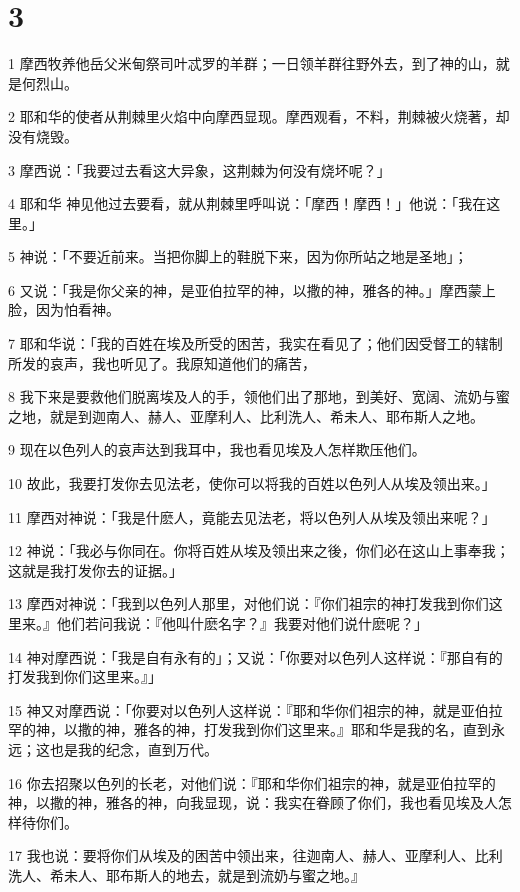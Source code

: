 \chapter{3}

\par 1 摩西牧养他岳父米甸祭司叶忒罗的羊群；一日领羊群往野外去，到了神的山，就是何烈山。
\par 2 耶和华的使者从荆棘里火焰中向摩西显现。摩西观看，不料，荆棘被火烧著，却没有烧毁。
\par 3 摩西说：「我要过去看这大异象，这荆棘为何没有烧坏呢？」
\par 4 耶和华 神见他过去要看，就从荆棘里呼叫说：「摩西！摩西！」他说：「我在这里。」
\par 5 神说：「不要近前来。当把你脚上的鞋脱下来，因为你所站之地是圣地」；
\par 6 又说：「我是你父亲的神，是亚伯拉罕的神，以撒的神，雅各的神。」摩西蒙上脸，因为怕看神。
\par 7 耶和华说：「我的百姓在埃及所受的困苦，我实在看见了；他们因受督工的辖制所发的哀声，我也听见了。我原知道他们的痛苦，
\par 8 我下来是要救他们脱离埃及人的手，领他们出了那地，到美好、宽阔、流奶与蜜之地，就是到迦南人、赫人、亚摩利人、比利洗人、希未人、耶布斯人之地。
\par 9 现在以色列人的哀声达到我耳中，我也看见埃及人怎样欺压他们。
\par 10 故此，我要打发你去见法老，使你可以将我的百姓以色列人从埃及领出来。」
\par 11 摩西对神说：「我是什麽人，竟能去见法老，将以色列人从埃及领出来呢？」
\par 12 神说：「我必与你同在。你将百姓从埃及领出来之後，你们必在这山上事奉我；这就是我打发你去的证据。」
\par 13 摩西对神说：「我到以色列人那里，对他们说：『你们祖宗的神打发我到你们这里来。』他们若问我说：『他叫什麽名字？』我要对他们说什麽呢？」
\par 14 神对摩西说：「我是自有永有的」；又说：「你要对以色列人这样说：『那自有的打发我到你们这里来。』」
\par 15 神又对摩西说：「你要对以色列人这样说：『耶和华你们祖宗的神，就是亚伯拉罕的神，以撒的神，雅各的神，打发我到你们这里来。』耶和华是我的名，直到永远；这也是我的纪念，直到万代。
\par 16 你去招聚以色列的长老，对他们说：『耶和华你们祖宗的神，就是亚伯拉罕的神，以撒的神，雅各的神，向我显现，说：我实在眷顾了你们，我也看见埃及人怎样待你们。
\par 17 我也说：要将你们从埃及的困苦中领出来，往迦南人、赫人、亚摩利人、比利洗人、希未人、耶布斯人的地去，就是到流奶与蜜之地。』
